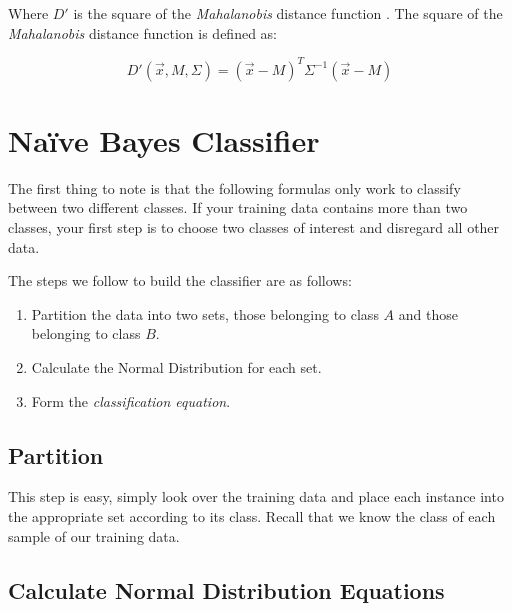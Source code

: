 \documentclass{article}
\begin{document}
Where $D'$ is the square of the \emph{Mahalanobis} distance function
\cite{wiki_mahalanobis}.  The square of the \emph{Mahalanobis} distance
function is defined as:

\begin{displaymath}
  D'(\vec{x},M,\Sigma) = (\vec{x}-M)^T \Sigma^{-1} (\vec{x}-M)
\end{displaymath}


\section{Na\"ive Bayes Classifier}
\label{sec:nbayes}

The first thing to note is that the following formulas only work to
classify between two different classes.  If your training data
contains more than two classes, your first step is to choose two
classes of interest and disregard all other data.

The steps we follow to build the classifier are as follows:

\begin{enumerate}

\item Partition the data into two sets, those belonging to class $A$
  and those belonging to class $B$.

\item Calculate the Normal Distribution for each set.

\item Form the \emph{classification equation}.

\end{enumerate}

\subsection{Partition}

This step is easy, simply look over the training data and place each
instance into the appropriate set according to its class.  Recall that
we know the class of each sample of our training data.

\subsection{Calculate Normal Distribution Equations}
\end{document}
